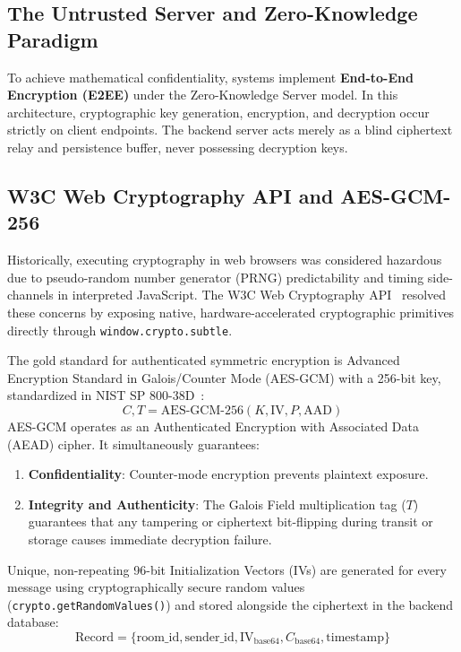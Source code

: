 \documentclass[10pt,twocolumn,a4paper]{article}
\begin{document}
\subsection{The Untrusted Server and Zero-Knowledge Paradigm}
To achieve mathematical confidentiality, systems implement \textbf{End-to-End Encryption (E2EE)} under the Zero-Knowledge Server model. In this architecture, cryptographic key generation, encryption, and decryption occur strictly on client endpoints. The backend server acts merely as a blind ciphertext relay and persistence buffer, never possessing decryption keys.

\subsection{W3C Web Cryptography API and AES-GCM-256}
Historically, executing cryptography in web browsers was considered hazardous due to pseudo-random number generator (PRNG) predictability and timing side-channels in interpreted JavaScript. The W3C Web Cryptography API~\cite{w3c_webcrypto} resolved these concerns by exposing native, hardware-accelerated cryptographic primitives directly through \texttt{window.crypto.subtle}.

The gold standard for authenticated symmetric encryption is Advanced Encryption Standard in Galois/Counter Mode (AES-GCM) with a 256-bit key, standardized in NIST SP 800-38D~\cite{nist_sp800_38d}:
\begin{equation}
C, T = \text{AES-GCM-256}(K, \text{IV}, P, \text{AAD})
\end{equation}
AES-GCM operates as an Authenticated Encryption with Associated Data (AEAD) cipher. It simultaneously guarantees:
\begin{enumerate}[leftmargin=*]
    \item \textbf{Confidentiality}: Counter-mode encryption prevents plaintext exposure.
    \item \textbf{Integrity and Authenticity}: The Galois Field multiplication tag ($T$) guarantees that any tampering or ciphertext bit-flipping during transit or storage causes immediate decryption failure.
\end{enumerate}
Unique, non-repeating 96-bit Initialization Vectors (IVs) are generated for every message using cryptographically secure random values (\texttt{crypto.getRandomValues()}) and stored alongside the ciphertext in the backend database:
\begin{equation}
\text{Record} = \{ \text{room\_id}, \text{sender\_id}, \text{IV}_{\text{base64}}, C_{\text{base64}}, \text{timestamp} \}
\end{equation}
\end{document}
